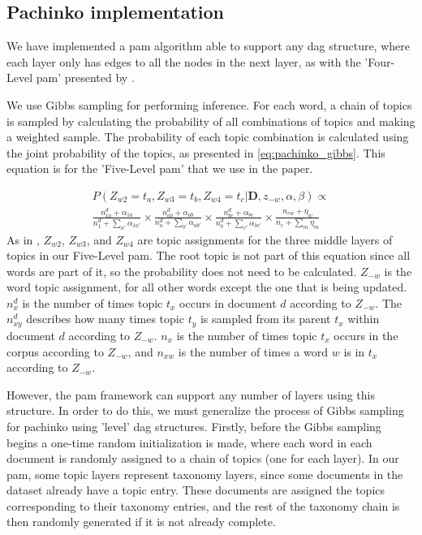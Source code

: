 \subsection{Pachinko implementation}
We have implemented a \acrfull{pam} algorithm able to support any \gls{dag} structure, where each layer only has edges to all the nodes in the next layer, as with the 'Four-Level \gls{pam}' presented by \citet{li2006pachinko}.

We use Gibbs sampling for performing inference.
For each word, a chain of topics is sampled by calculating the probability of all combinations of topics and making a weighted sample.
The probability of each topic combination is calculated using the joint probability of the topics, as presented in \autoref{eq:pachinko_gibbs}. This equation is for the 'Five-Level \gls{pam}' that we use in the paper.

\begin{equation}\label{eq:pachinko_gibbs}
	\begin{split}
		P(Z_{w2} = t_a, Z_{w3} = t_b, Z_{w4} = t_c | \textbf{D}, z_{-w}, \alpha, \beta) \propto \\
		\frac{n_{1a}^d + \alpha_{1a}}{n_1^d + \sum_{a'} \alpha_{1a'}} \times
		\frac{n_{ab}^d + \alpha_{ab}}{n_a^d + \sum_{b'} \alpha_{ab'}}  \times 
		\frac{n_{bc}^d + \alpha_{bc}}{n_{b}^d + \sum_{c'} \alpha_{bc'}} \times 
		\frac{n_{cw} + \eta_{w}}{n_{c} + \sum_{m} \eta_{m}} 
	\end{split}
\end{equation}
As in \citet{li2006pachinko}, $Z_{w2}$, $Z_{w3}$, and $Z_{w4}$ are topic assignments for the three middle layers of topics in our Five-Level \gls{pam}.
The root topic is not part of this equation since all words are part of it, so the probability does not need to be calculated.
$Z_{-w}$ is the word topic assignment, for all other words except the one that is being updated.
$n_x^d$ is the number of times topic $t_x$ occurs in document $d$ according to $Z_{-w}$. 
The $n_{xy}^d$ describes how many times topic $t_y$ is sampled from its parent $t_x$ within document $d$ according to $Z_{-w}$.
$n_x$ is the number of times topic $t_x$ occurs in the corpus according to $Z_{-w}$, and $n_{xw}$ is the number of times a word $w$ is in $t_x$ according to $Z_{-w}$.

However, the \gls{pam} framework can support any number of layers using this structure.
In order to do this, we must generalize the process of Gibbs sampling for pachinko using 'level' \gls{dag} structures.
Firstly, before the Gibbs sampling begins a one-time random initialization is made, where each word in each document is randomly assigned to a chain of topics (one for each layer).
In our \gls{pam}, some topic layers represent taxonomy layers, since some documents in the dataset already have a topic entry.
These documents are assigned the topics corresponding to their taxonomy entries, and the rest of the taxonomy chain is then randomly generated if it is not already complete.


